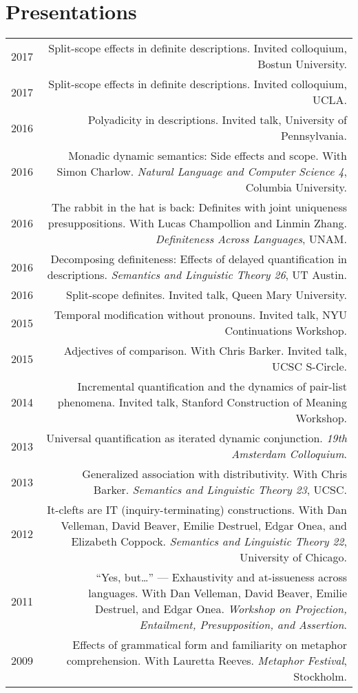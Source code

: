 \documentclass[12pt]{article}
\begin{document}
\bigskip

\section*{Presentations}

\begin{longtable}{LR}
  2017 &  Split-scope effects in definite descriptions. Invited colloquium,
          Bostun University.\\
  2017 &  Split-scope effects in definite descriptions. Invited colloquium,
          UCLA.\\
  2016 &  Polyadicity in descriptions. Invited talk, University of
          Pennsylvania.\\
  2016 &  Monadic dynamic semantics: Side effects and scope. With Simon
          Charlow. \textit{Natural Language and Computer Science 4}, Columbia
          University.\\
  2016 &  The rabbit in the hat is back: Definites with joint uniqueness
          presuppositions. With Lucas Champollion and Linmin Zhang.
          \textit{Definiteness Across Languages}, UNAM.\\
  2016 &  Decomposing definiteness: Effects of delayed quantification in
          descriptions. \textit{Semantics and Linguistic Theory 26}, UT Austin.\\
  2016 &  Split-scope definites. Invited talk, Queen Mary University.\\
  2015 &  Temporal modification without pronouns. Invited talk, NYU
          Continuations Workshop.\\
  2015 &  Adjectives of comparison. With Chris Barker. Invited talk, UCSC
          S-Circle.\\
  2014 &  Incremental quantification and the dynamics of pair-list phenomena.
          Invited talk, Stanford Construction of Meaning Workshop.\\
  2013 &  Universal quantification as iterated dynamic conjunction. \textit{19th
          Amsterdam Colloquium}. \\
  2013 &  Generalized association with distributivity. With Chris Barker.
          \textit{Semantics and Linguistic Theory 23}, UCSC.\\
  2012 &  It-clefts are IT (inquiry-terminating) constructions. With Dan
          Velleman, David Beaver, Emilie Destruel, Edgar Onea, and Elizabeth
          Coppock. \textit{Semantics and Linguistic Theory 22}, University of
          Chicago.\\
  2011 &  ``Yes, but\dots'' --- Exhaustivity and at-issueness across languages.
           With Dan Velleman, David Beaver, Emilie Destruel, and Edgar Onea.
           \textit{Workshop on Projection, Entailment, Presupposition, and
           Assertion}.\\
  2009 &  Effects of grammatical form and familiarity on metaphor
          comprehension. With Lauretta Reeves. \textit{Metaphor Festival},
          Stockholm.
\end{longtable}
\end{document}
